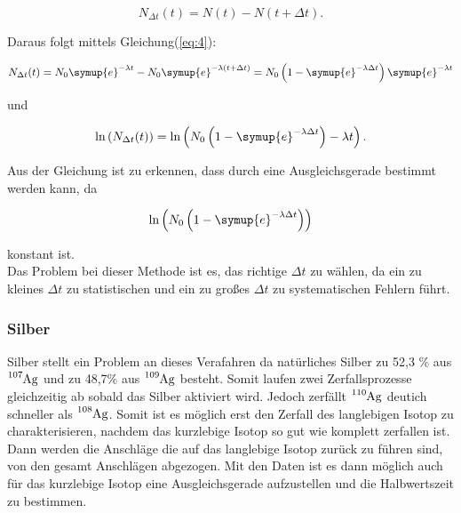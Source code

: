 \begin{equation}
   N_{\Delta t}(t) = N(t) - N(t + \Delta t) . \nonumber
\end{equation}

\noindent Daraus folgt mittels Gleichung(\ref{eq:4}):

\begin{equation}
   N_{\Delta t}(t) = N_0 \symup{e}^{ - \lambda t} - N_0 \symup{e}^{- \lambda \left( t + \Delta t \right) } = N_0 \left( 1 - \symup{e}^{-\lambda \Delta t} \right) \symup{e}^{-\lambda t} \nonumber
\end{equation}

\noindent und

\begin{equation}
   \text{ln} \left( N_{\Delta t}(t)\right) = \text{ln} \left( N_0 \left( 1- \symup{e}^{-\lambda \Delta t}\right) -\lambda t \right) .
\label{eq:5}
\end{equation}

\noindent Aus der Gleichung ist zu erkennen, dass \lambda durch eine Ausgleichsgerade bestimmt werden kann, da 

\begin{equation}
   \text{ln}\left(N_0\left(1- \symup{e}^{-\lambda\Delta t}\right)  \right) \nonumber
\end{equation}

\noindent konstant ist.\\ 
Das Problem bei dieser Methode ist es, das richtige $\Delta t$ zu wählen, da ein zu kleines $\Delta t$ zu statistischen und 
ein zu großes $\Delta t$ zu systematischen Fehlern führt.

\subsubsection{Silber}

\noindent Silber stellt ein Problem an dieses Verafahren da natürliches Silber zu 52,3 \% aus $\ce{^{107}\text{Ag}}$ und zu 48,7\% aus $\ce{^{109}\text{Ag}}$ 
besteht. Somit laufen zwei Zerfallsprozesse gleichzeitig ab sobald das Silber aktiviert wird. Jedoch zerfällt $\ce{^{110}\text{Ag}}$ deutich schneller 
als $\ce{^{108}\text{Ag}}$. Somit ist es möglich erst den Zerfall des langlebigen Isotop zu charakterisieren, nachdem das kurzlebige Isotop so gut 
wie komplett zerfallen ist. Dann werden die Anschläge die auf das langlebige Isotop zurück zu führen sind, von den gesamt Anschlägen abgezogen. Mit 
den Daten ist es dann möglich auch für das kurzlebige Isotop eine Ausgleichsgerade aufzustellen und die Halbwertszeit zu bestimmen.

